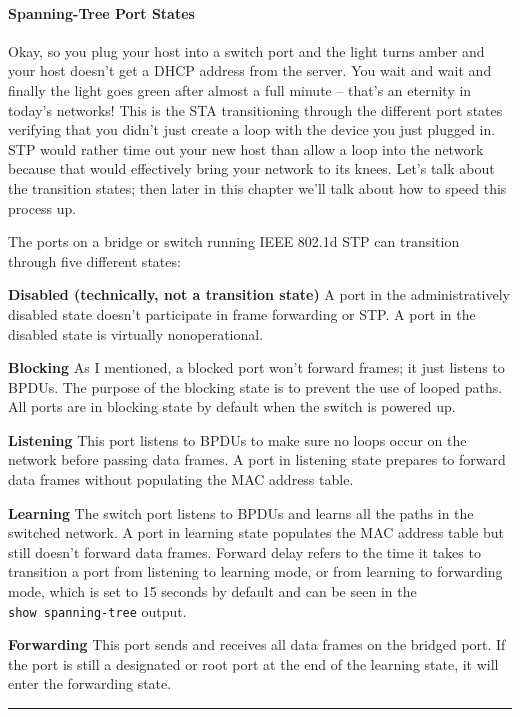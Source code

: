 \paragraph{Spanning-Tree Port States}

Okay, so you plug your host into a switch port and the light turns amber
and your host doesn't get a DHCP address from the server. You wait and
wait and finally the light goes green after almost a full
minute -- that's an eternity in today's networks! This is the STA
transitioning through the different port states verifying that you
didn't just create a loop with the device you just plugged in. STP would
rather time out your new host than allow a loop into the network because
that would effectively bring your network to its knees. Let's talk about
the transition states; then later in this chapter we'll talk about how
to speed this process up.

The ports on a bridge or switch running IEEE 802.1d STP can transition
through five different states:

\textbf{Disabled (technically, not a transition state)} A port in the
administratively disabled state doesn't participate in frame forwarding
or STP. A port in the disabled state is virtually nonoperational.

\textbf{Blocking} As I mentioned, a blocked port won't forward frames;
it just listens to BPDUs. The purpose of the blocking state is to
prevent the use of looped paths. All ports are in blocking state by
default when the switch is powered up.

\textbf{Listening} This port listens to BPDUs to make sure no loops
occur on the network before passing data frames. A port in listening
state prepares to forward data frames without populating the MAC address
table.

\textbf{Learning} The switch port listens to BPDUs and learns all the
paths in the switched network. A port in learning state populates the
MAC address table but still doesn't forward data frames. Forward delay
refers to the time it takes to transition a port from listening to
learning mode, or from learning to forwarding mode, which is set to 15
seconds by default and can be seen in the \texttt{show\ spanning-tree}
output.

\textbf{Forwarding}
This port sends and receives all data frames on the bridged port. If the
port is still a designated or root port at the end of the learning
state, it will enter the forwarding state.

\begin{center}\rule{0.5\linewidth}{0.5pt}\end{center}

